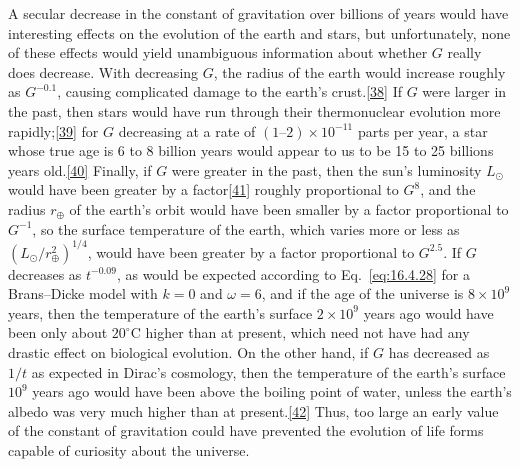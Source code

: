 A secular decrease in the constant of gravitation over billions of years would
have interesting effects on the evolution of the earth and stars, but
unfortunately, none of these effects would yield unambiguous information about
whether \(G\) really does decrease. With decreasing \(G\), the radius of the
earth would increase roughly as \(G^{-0.1}\), causing complicated damage to the
earth's crust.\hyperref[ch16-ref-38]{[38]} If \(G\) were larger in the past,
then stars would have run through their thermonuclear evolution more
rapidly;\hyperref[ch16-ref-39]{[39]} for \(G\) decreasing at a rate of
\((1\text{--}2)\times10^{-11}\) parts per year, a star whose true age is 6 to
8 billion years would appear to us to be 15 to 25 billions years
old.\hyperref[ch16-ref-40]{[40]} Finally, if \(G\) were greater in the past,
then the sun's luminosity \(L_\odot\) would have been greater by a
factor\hyperref[ch16-ref-41]{[41]} roughly proportional to \(G^8\), and the
radius \(r_\oplus\) of the earth's orbit would have been smaller by a factor
proportional to \(G^{-1}\), so the surface temperature of the earth, which
varies more or less as \((L_\odot/r_\oplus^2)^{1/4}\), would have been greater
by a factor proportional to \(G^{2.5}\). If \(G\) decreases as \(t^{-0.09}\),
as would be expected according to Eq.~\eqref{eq:16.4.28} for a Brans--Dicke
model with \(k=0\) and \(\omega=6\), and if the age of the universe is
\(8\times10^9\) years, then the temperature of the earth's surface
\(2\times10^9\) years ago would have been only about
\(20^\circ\mathrm C\) higher than at present, which need not have had any
drastic effect on biological evolution. On the other hand, if \(G\) has
decreased as \(1/t\) as expected in Dirac's cosmology, then the temperature of
the earth's surface \(10^9\) years ago would have been above the boiling point
of water, unless the earth's albedo was very much higher than at
present.\hyperref[ch16-ref-42]{[42]} Thus, too large an early value of the
constant of gravitation could have prevented the evolution of life forms
capable of curiosity about the universe.

